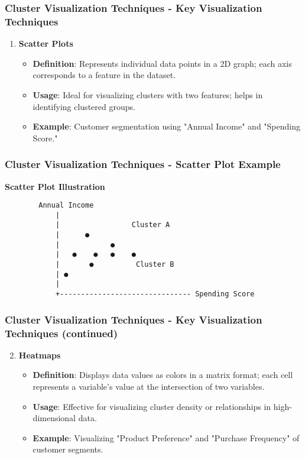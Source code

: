 \documentclass[aspectratio=169]{beamer}
\begin{document}
\begin{frame}[fragile]
    \frametitle{Cluster Visualization Techniques - Key Visualization Techniques}
    \begin{enumerate}
        \item \textbf{Scatter Plots}
            \begin{itemize}
                \item \textbf{Definition}: Represents individual data points in a 2D graph; each axis corresponds to a feature in the dataset.
                \item \textbf{Usage}: Ideal for visualizing clusters with two features; helps in identifying clustered groups.
                \item \textbf{Example}: Customer segmentation using "Annual Income" and "Spending Score."
            \end{itemize}
    \end{enumerate}
\end{frame}

\begin{frame}[fragile]
    \frametitle{Cluster Visualization Techniques - Scatter Plot Example}
    \begin{center}
        \textbf{Scatter Plot Illustration}
        \begin{verbatim}
        Annual Income
            |
            |                 Cluster A
            |      ●
            |            ●
            |   ●    ●   ●    ●
            |       ●          Cluster B
            | ●
            |
            +------------------------------- Spending Score
        \end{verbatim}
    \end{center}
\end{frame}

\begin{frame}[fragile]
    \frametitle{Cluster Visualization Techniques - Key Visualization Techniques (continued)}
    \begin{enumerate}
        \setcounter{enumi}{1} %
        \item \textbf{Heatmaps}
            \begin{itemize}
                \item \textbf{Definition}: Displays data values as colors in a matrix format; each cell represents a variable's value at the intersection of two variables.
                \item \textbf{Usage}: Effective for visualizing cluster density or relationships in high-dimensional data.
                \item \textbf{Example}: Visualizing "Product Preference" and "Purchase Frequency" of customer segments.
            \end{itemize}
    \end{enumerate}
\end{frame}
\end{document}
